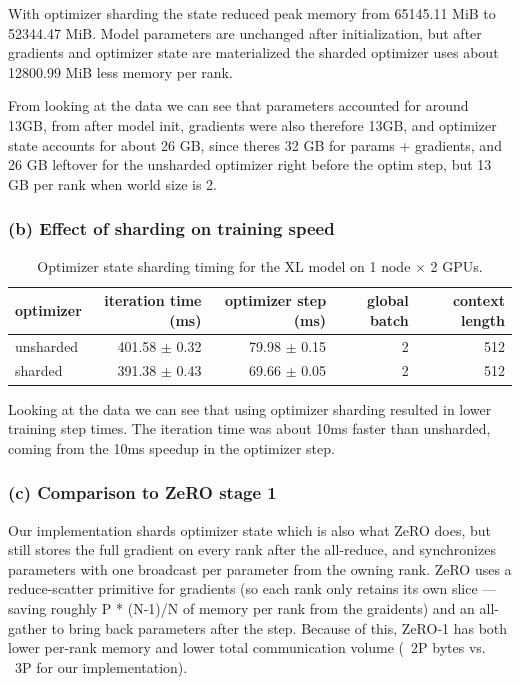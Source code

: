 \documentclass[11pt]{article}
\begin{document}
With optimizer sharding the state reduced peak memory from 65145.11 MiB to 52344.47 MiB. 
Model parameters are unchanged after initialization, but after gradients and optimizer state are materialized the sharded optimizer uses about 12800.99 MiB less memory per rank.

From looking at the data we can see that parameters accounted for around 13GB, from after model init, gradients were also therefore 13GB,
and optimizer state accounts for about 26 GB, since theres 32 GB for params + gradients, and 26 GB leftover for the unsharded optimizer right before the optim step, but 13 GB per rank 
when world size is 2.


\subsubsection*{(b) Effect of sharding on training speed}

\begin{table}[H]
\centering
\caption{Optimizer state sharding timing for the XL model on 1 node $\times$ 2 GPUs.}
\begin{tabular}{lrrrr}
\toprule
optimizer & iteration time (ms) & optimizer step (ms) & global batch & context length \\
\midrule
unsharded & 401.58 $\pm$ 0.32 & 79.98 $\pm$ 0.15 & 2 & 512 \\
sharded & 391.38 $\pm$ 0.43 & 69.66 $\pm$ 0.05 & 2 & 512 \\
\bottomrule
\end{tabular}
\end{table}

Looking at the data we can see that using optimizer sharding resulted in lower training step times. The iteration time
was about 10ms faster than unsharded, coming from the 10ms speedup in the optimizer step.

\subsubsection*{(c) Comparison to ZeRO stage 1}

Our implementation shards optimizer state which is also what ZeRO does, but still stores the full gradient on every rank after the all-reduce, and synchronizes parameters with one broadcast per parameter from the owning rank. 
ZeRO uses a reduce-scatter primitive for gradients (so each rank only retains its own slice — saving roughly P * (N-1)/N of memory per rank from the graidents) and an all-gather to bring back parameters after the step. 
Because of this, ZeRO-1 has both lower per-rank memory and lower total communication volume (~2P bytes vs. ~3P for our implementation).
\end{document}
